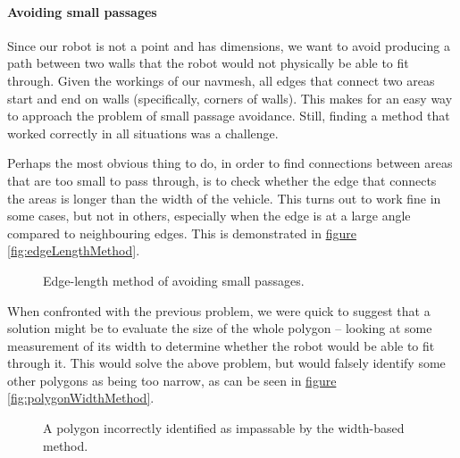 \documentclass[10pt, abstracton, twocolumn]{scrartcl}
\newcommand{\fref}[1]{\hyperref[#1]{figure \vref{#1}}}
\begin{document}
\paragraph{Avoiding small passages}
Since our robot is not a point and has dimensions, we want to avoid producing a path between two walls that the robot would not physically be able to fit through. Given the workings of our navmesh, all edges that connect two areas start and end on walls (specifically, corners of walls). This makes for an easy way to approach the problem of small passage avoidance. Still, finding a method that worked correctly in all situations was a challenge.

Perhaps the most obvious thing to do, in order to find connections between areas that are too small to pass through, is to check whether the edge that connects the areas is longer than the width of the vehicle. This turns out to work fine in some cases, but not in others, especially when the edge is at a large angle compared to neighbouring edges. This is demonstrated in \fref{fig:edgeLengthMethod}.

\begin{figure}
        \centering
        \begin{subfigure}[t]{0.45\columnwidth}
        \centering
        
        \end{subfigure}
        \begin{subfigure}[t]{0.45\columnwidth}
        \centering
        
        \end{subfigure}
        \caption{\small Edge-length method of avoiding small passages.}
        \label{fig:edgeLengthMethod}
\end{figure}

When confronted with the previous problem, we were quick to suggest that a solution might be to evaluate the size of the whole polygon -- looking at some measurement of its width to determine whether the robot would be able to fit through it. This would solve the above problem, but would falsely identify some other polygons as being too narrow, as can be seen in \fref{fig:polygonWidthMethod}.

\begin{figure}
        \centering
        
        \caption{\small A polygon incorrectly identified as impassable by the width-based method.}
        \label{fig:polygonWidthMethod}
\end{figure}
\end{document}
